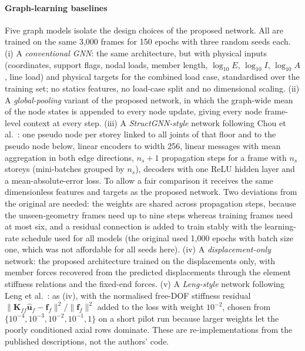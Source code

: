 \paragraph{Graph-learning baselines}\label{sec:graphbaselinesdef} Five graph models isolate the design choices of the proposed network. All are trained on the same 3{,}000 frames for 150 epochs with three random seeds each.
(i) A \emph{conventional GNN}: the same architecture, but with physical inputs (coordinates, support flags, nodal loads, member length, $\log_{10}E$, $\log_{10}I$, $\log_{10}A$, line load) and physical targets for the combined load case, standardised over the training set; no statics features, no load-case split and no dimensional scaling.
(ii) A \emph{global-pooling} variant of the proposed network, in which the graph-wide mean of the node states is appended to every node update, giving every node frame-level context at every step.
(iii) A \emph{StructGNN-style} network following Chou et al.~\cite{chou2024structgnn}: one pseudo node per storey linked to all joints of that floor and to the pseudo node below, linear encoders to width 256, linear messages with mean aggregation in both edge directions, $n_s+1$ propagation steps for a frame with $n_s$ storeys (mini-batches grouped by $n_s$), decoders with one ReLU hidden layer and a mean-absolute-error loss. To allow a fair comparison it receives the same dimensionless features and targets as the proposed network. Two deviations from the original are needed: the weights are shared across propagation steps, because the unseen-geometry frames need up to nine steps whereas training frames need at most six, and a residual connection is added to train stably with the learning-rate schedule used for all models (the original used 1{,}000 epochs with batch size one, which was not affordable for all seeds here).
(iv) A \emph{displacement-only} network: the proposed architecture trained on the displacements only, with member forces recovered from the predicted displacements through the element stiffness relations and the fixed-end forces.
(v) A \emph{Leng-style} network following Leng et al.~\cite{leng2026mcgnn}: as (iv), with the normalised free-DOF stiffness residual $\|\mathbf{K}_{ff}\hat{\mathbf{u}}_f-\mathbf{f}_f\|^2/\|\mathbf{f}_f\|^2$ added to the loss with weight $10^{-2}$, chosen from $\{10^{-4},10^{-3},10^{-2},10^{-1},1\}$ on a short pilot run because larger weights let the poorly conditioned axial rows dominate. These are re-implementations from the published descriptions, not the authors' code.
